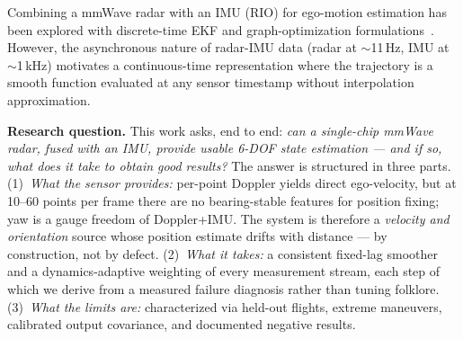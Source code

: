 \documentclass[conference]{IEEEtran}
\begin{document}
Combining a mmWave radar with an IMU (RIO) for ego-motion estimation
has been explored with discrete-time EKF and graph-optimization
formulations~\cite{doer2020ekf,kramer2020rve}.  However, the
asynchronous nature of radar-IMU data (radar at $\sim$11\,Hz, IMU at
$\sim$1\,kHz) motivates a continuous-time representation where the
trajectory is a smooth function evaluated at any sensor timestamp
without interpolation approximation.

\textbf{Research question.}
This work asks, end to end: \emph{can a single-chip mmWave radar,
fused with an IMU, provide usable 6-DOF state estimation --- and if
so, what does it take to obtain good results?}  The answer is
structured in three parts.  (1)~\emph{What the sensor provides:}
per-point Doppler yields direct ego-velocity, but at 10--60 points
per frame there are no bearing-stable features for position fixing;
yaw is a gauge freedom of Doppler+IMU.  The system is therefore a
\emph{velocity and orientation} source whose position estimate drifts
with distance --- by construction, not by defect.  (2)~\emph{What it
takes:} a consistent fixed-lag smoother and a dynamics-adaptive
weighting of every measurement stream, each step of which we derive
from a measured failure diagnosis rather than tuning folklore.
(3)~\emph{What the limits are:} characterized via held-out flights,
extreme maneuvers, calibrated output covariance, and documented
negative results.
\end{document}
